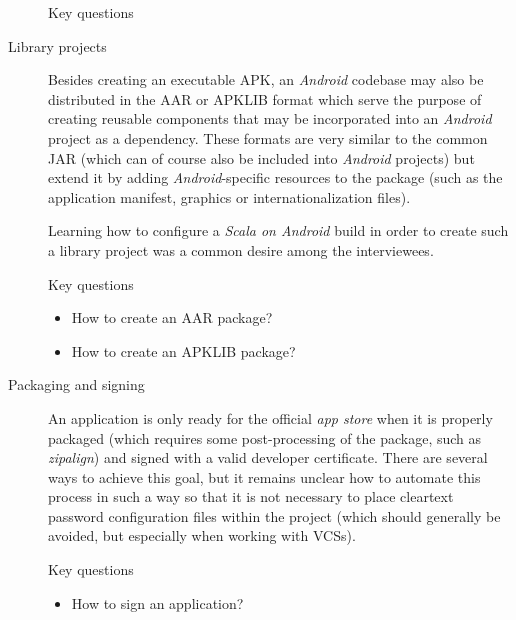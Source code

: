 \begin{description}
\begin{highlight}{Key questions}
	\end{highlight}

	\item[Library projects]\hfill

	Besides creating an executable \ac{APK}, an \textit{Android} codebase may also be distributed in the \ac{AAR} or \ac{APKLIB} format which serve the purpose of creating reusable components that may be incorporated into an \textit{Android} project as a dependency. These formats are very similar to the common \ac{JAR} (which can of course also be included into \textit{Android} projects) but extend it by adding \textit{Android}-specific resources to the package (such as the application manifest, graphics or internationalization files).

	Learning how to configure a \textit{Scala on Android} build in order to create such a library project was a common desire among the interviewees.

	\begin{highlight}{Key questions}

		\begin{itemize}

			\item How to create an \ac{AAR} package?

			\item How to create an \ac{APKLIB} package?

		\end{itemize}

	\end{highlight}

	\item[Packaging and signing]\hfill

	An application is only ready for the official \textit{app store} when it is properly packaged (which requires some post-processing of the package, such as \textit{zipalign}) and signed with a valid developer certificate. There are several ways to achieve this goal, but it remains unclear how to automate this process in such a way so that it is not necessary to place cleartext password configuration files within the project (which should generally be avoided, but especially when working with \acp{VCS}).

	\begin{highlight}{Key questions}

		\begin{itemize}

			\item How to sign an application?


\end{itemize}
\end{highlight}
\end{description}
